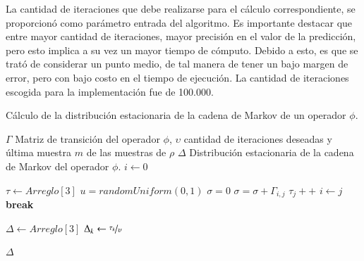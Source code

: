 La cantidad de iteraciones que debe realizarse para el cálculo correspondiente, se proporcionó como parámetro entrada del algoritmo. Es importante destacar que entre mayor cantidad de iteraciones, mayor precisión en el valor de la predicción, pero esto implica a su vez un mayor tiempo de cómputo. Debido a esto, es que se trató de considerar un punto medio, de tal manera de tener un bajo margen de error, pero con bajo costo en el tiempo de ejecución. La cantidad de iteraciones escogida para la implementación fue de 100.000.

\begin{algorithm}[!ht]
	\caption{Cálculo de la distribución estacionaria de la cadena de Markov de un operador $\phi$.}
	\label{alg:distEstacionaria}
	\begin{algorithmic}[1]
	\REQUIRE $\Gamma$ Matriz de transición del operador $\phi$, $\upsilon$ cantidad de iteraciones deseadas y última muestra $m$ de las muestras de $\rho$
	\ENSURE $\Delta$ Distribución estacionaria de la cadena de Markov del operador $\phi$.
	\STATE $i \leftarrow 0$ 
	\ELSE
	\ENDIF
	
	\STATE $\tau \leftarrow Arreglo[3]$ 
		\STATE $u = randomUniform(0,1)$
		\STATE $\sigma = 0$
			\STATE $\sigma = \sigma + \Gamma_{i,j}$
				\STATE $\tau_{j}++$
				\STATE $i \leftarrow j$
				\STATE \textbf{break}
			\ENDIF
		\ENDFOR
	\ENDFOR

	\STATE $\Delta \leftarrow Arreglo[3]$ 
		\STATE $\Delta_{k} \leftarrow \nicefrac{\tau_{k}}{\upsilon}$
	\ENDFOR	
	
	\RETURN $\Delta$
	
	\end{algorithmic}
\end{algorithm}

